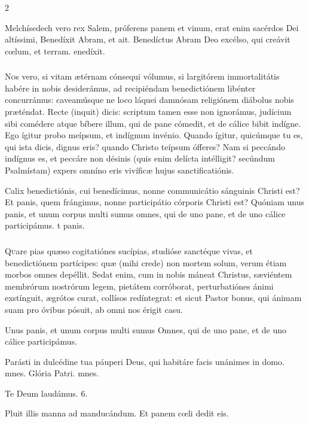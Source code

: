 \documentclass[9pt,twoside]{extarticle}
\begin{document}
\begin{multicols}{2}
\begin{tightlist}{}
\item {} Melchísedech vero rex Salem, próferens panem et vinum, erat enim sacérdos Dei altíssimi, \textred{*} Benedíxit Abram, et ait.  Benedíctus Abram Deo excélso, qui creávit cœlum, et terram. enedíxit.
\end{tightlist}

\subsubsection*{\center {}}
\lettrine{N}os vero, si vitam ætérnam cónsequi vólumus, si largitórem immortalitátis habére in nobis desiderámus, ad recipiéndam benedictiónem libénter concurrámus: caveamúsque ne loco láquei damnósam religiónem diábolus nobis præténdat. Recte (inquit) dicis: scriptum tamen esse non ignorámus, judícium sibi comédere atque bíbere illum, qui de pane cómedit, et de cálice bibit indígne. Ego ígitur probo meípsum, et indígnum invénio. Quando ígitur, quicúmque tu es, qui ista dicis, dignus eris? quando Christo teípsum ófferes? Nam si peccándo indígnus es, et peccáre non désinis (quis enim delícta intélligit? secúndum Psalmístam) expers omníno eris vivíficæ hujus sanctificatiónis.

\begin{tightlist}{}
\item {} Calix benedictiónis, cui benedícimus, nonne communicátio sánguinis Christi est? \textred{*} Et panis, quem frángimus, nonne participátio córporis Christi est?  Quóniam unus panis, et unum corpus multi sumus omnes, qui de uno pane, et de uno cálice participámus. t panis.
\end{tightlist}

\subsubsection*{\center {}}
\lettrine{Q}uare pias quæso cogitatiónes sucípias, studióse sanctéque vivas, et benedictiónem partícipes: quæ (mihi crede) non mortem solum, verum étiam morbos omnes depéllit. Sedat enim, cum in nobis máneat Christus, sæviéntem membrórum nostrórum legem, pietátem corróborat, perturbatiónes ánimi exstínguit, ægrótos curat, collísos redíntegrat: et sicut Pastor bonus, qui ánimam suam pro óvibus pósuit, ab omni nos érigit casu.

\begin{tightlist}{}
\item {} Unus panis, et unum corpus multi sumus \textred{*} Omnes, qui de uno pane, et de uno cálice participámus. 
\item {} Parásti in dulcédine tua páuperi Deus, qui habitáre facis unánimes in domo. mnes. Glória Patri. mnes.
\item Te Deum laudámus. 6.
\item {} Pluit illis manna ad manducándum.  Et panem cœli dedit eis.
\end{tightlist}


\end{multicols}
\end{document}
